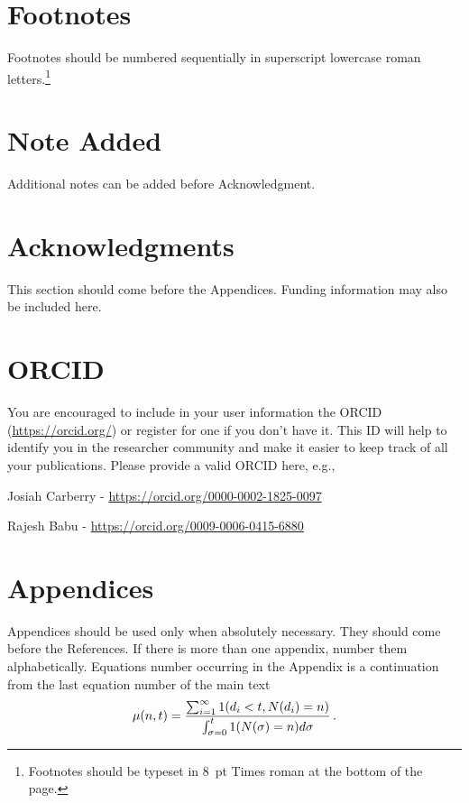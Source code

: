 \documentclass{ws-jbcb}
\begin{document}
\section{Footnotes}
Footnotes should be numbered sequentially in superscript
lowercase roman letters.\footnote{Footnotes should be
typeset in 8~pt Times roman at the bottom of the page.}

\section*{Note Added}
Additional notes can be added before Acknowledgment.

\section*{Acknowledgments}
This section should come before the Appendices. Funding
information may also be included here.

\section*{ORCID}
You are encouraged to include in your user information the ORCID (\url{https://orcid.org/}) or register for one if you don't have it. This ID will help to identify you in the researcher community and make it easier to keep track of all your publications.
Please provide a valid ORCID here, e.g.,

\noindent Josiah Carberry - \url{https://orcid.org/0000-0002-1825-0097}

\noindent Rajesh Babu - \url{https://orcid.org/0009-0006-0415-6880}

\appendix

\section{Appendices}
Appendices should be used only when absolutely necessary. They
should come before the References. If there is more than one
appendix, number them alphabetically. Equations number
occurring in the Appendix is a continuation from the last
equation number of the main text
\begin{equation}
\mu(n, t) = {\sum^\infty_{i=1} 1(d_i < t, N(d_i) = n) \over
\int^t_{\sigma=0} 1(N(\sigma) = n)d\sigma}\,.
\label{appeqn}
\end{equation}
\end{document}
